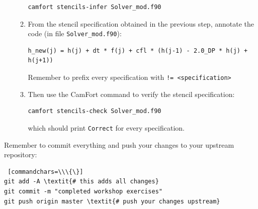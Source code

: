 \documentclass[12pt]{article}
\begin{document}
\begin{enumerate}
\begin{enumerate}
\begin{verbatim}
camfort stencils-infer Solver_mod.f90
\end{verbatim}
\item From the stencil specification obtained in the previous step, annotate the code (in file \texttt{Solver\_mod.f90}):
\begin{verbatim}
h_new(j) = h(j) + dt * f(j) + cfl * (h(j-1) - 2.0_DP * h(j) + h(j+1))
\end{verbatim}
Remember to prefix every specification with \texttt{!= <specification>} 
\item Then use the CamFort command to verify the stencil specification:
\begin{verbatim}
camfort stencils-check Solver_mod.f90
\end{verbatim}
which should print \texttt{Correct} for every specification. 
\end{enumerate}
\end{enumerate}
Remember to commit everything and push your changes to your upstream repository:
\begin{Verbatim} [commandchars=\\\{\}]
git add -A \textit{# this adds all changes}
git commit -m "completed workshop exercises"
git push origin master \textit{# push your changes upstream}
\end{Verbatim}
\end{document}
